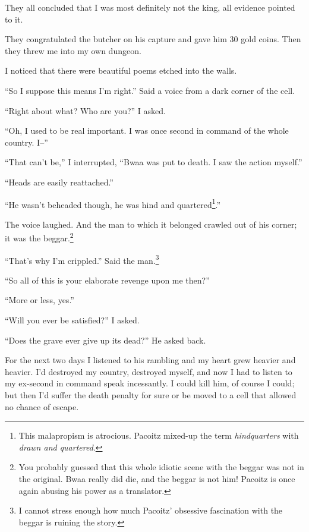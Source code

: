 They all concluded that I was most definitely not the king, all evidence pointed to it.

They congratulated the butcher on his capture and gave him 30 gold coins. Then they threw me into my own dungeon.

I noticed that there were beautiful poems etched into the walls. 

``So I suppose this means I'm right.'' Said a voice from a dark corner of the cell.

``Right about what? Who are you?'' I asked.

``Oh, I used to be real important. I was once second in command of the whole country. I--''

``That can't be,'' I interrupted, ``Bwaa was put to death. I saw the action myself.''

``Heads are easily reattached.''

``He wasn't beheaded though, he was hind and quartered\footnote{This malapropism is atrocious. Pacoitz mixed-up the term \emph{hindquarters} with \emph{drawn and quartered}.}.''

The voice laughed. And the man to which it belonged crawled out of his corner; it was the beggar.\footnote{You probably guessed that this whole idiotic scene with the beggar was not in the original. Bwaa really did die, and the beggar is not him! Pacoitz is once again abusing his power as a translator.}

``That's why I'm crippled.'' Said the man.\footnote{I cannot stress enough how much Pacoitz' obsessive fascination with the beggar is ruining the story.}

``So all of this is your elaborate revenge upon me then?''

``More or less, yes.''

``Will you ever be satisfied?'' I asked.

``Does the grave ever give up its dead?'' He asked back.

For the next two days I listened to his rambling and my heart grew heavier and heavier. I'd destroyed my country, destroyed myself, and now I had to listen to my ex-second in command speak incessantly. I could kill him, of course I could; but then I'd suffer the death penalty for sure or be moved to a cell that allowed no chance of escape.
